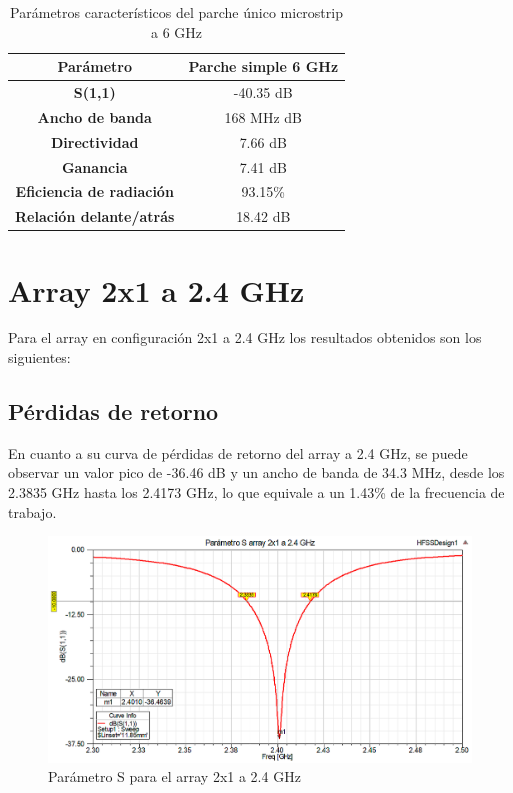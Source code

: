 \begin{table}[H]
  
  
   \small %
   \centering %
   \begin{tabular}{c c} %
   \toprule[\heavyrulewidth]\toprule[\heavyrulewidth]
   \textbf{Parámetro} & \textbf{Parche simple 6 GHz} \\ 
   \midrule
   \textbf{S(1,1)} & -40.35 dB \\
   \textbf{Ancho de banda} & 168 MHz dB \\
   \textbf{Directividad} & 7.66 dB \\
   \textbf{Ganancia} & 7.41 dB \\
   \textbf{Eficiencia de radiación} & 93.15\% \\
   \textbf{Relación delante/atrás} & 18.42 dB \\

   \bottomrule[\heavyrulewidth] 
   \end{tabular}
   \caption{Parámetros característicos del parche único microstrip a 6 GHz} 
    \label{tab:res1x12}
\end{table}









\section{Array 2x1 a 2.4 GHz}
\par Para el array en configuración 2x1 a 2.4 GHz los resultados obtenidos son los siguientes:

\subsection{Pérdidas de retorno}
\par En cuanto a su curva de pérdidas de retorno del array a 2.4 GHz, se puede observar un valor pico de -36.46 dB y un ancho de banda de 34.3 MHz, desde los 2.3835 GHz hasta los 2.4173 GHz, lo que equivale a un 1.43\% de la frecuencia de trabajo.
\\
\begin{figure}[H]
    \centering
        \includegraphics[width=\textwidth]{archivos/analisis/2x11/1}
        \caption{Parámetro S para el array 2x1 a 2.4 GHz}
        \label{fig:s2x11}
\end{figure}

